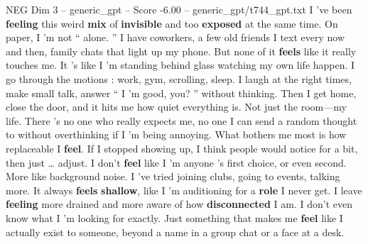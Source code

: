 \begin{textsample}{NEG Dim 3 – generic\_gpt – Score -6.00 – generic\_gpt/t744\_gpt.txt}  \label{ex:f3_neg_002}
I ’ve been \textbf{feeling} this weird \textbf{mix} of \textbf{invisible} and too \textbf{exposed} at the same time.
On paper, I ’m not “ alone. ” I have coworkers, a few old friends I text every now and then, family chats that light up my phone.
But none of it \textbf{feels} like it really touches me.
It ’s like I ’m standing behind glass watching my own life happen.
I go through the motions : work, gym, scrolling, sleep.
I laugh at the right times, make small talk, answer “ I ’m good, you? ” without thinking.
Then I get home, close the door, and it hits me how quiet everything is.
Not just the room—my life.
There ’s no one who really expects me, no one I can send a random thought to without overthinking if I ’m being annoying.
What bothers me most is how replaceable I \textbf{feel}.
If I stopped showing up, I think people would notice for a bit, then just … adjust.
I don't \textbf{feel} like I ’m anyone ’s first choice, or even second.
More like background noise.
I ’ve tried joining clubs, going to events, talking more.
It always \textbf{feels} \textbf{shallow}, like I ’m auditioning for a \textbf{role} I never get.
I leave \textbf{feeling} more drained and more aware of how \textbf{disconnected} I am.
I don't even know what I ’m looking for exactly.
Just something that makes me \textbf{feel} like I actually exist to someone, beyond a name in a group chat or a face at a desk.

\end{textsample}
